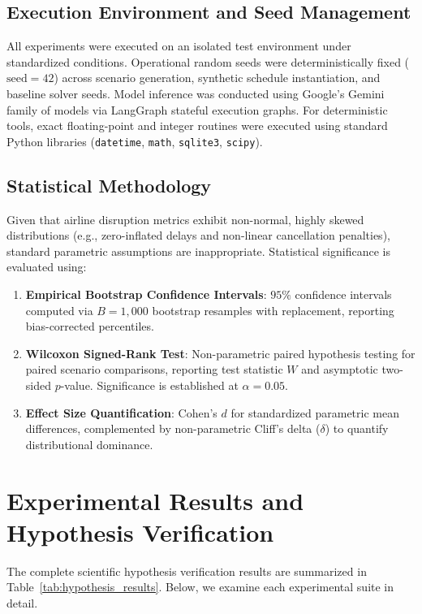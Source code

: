 \subsection{Execution Environment and Seed Management}
All experiments were executed on an isolated test environment under standardized conditions. Operational random seeds were deterministically fixed ($\text{seed}=42$) across scenario generation, synthetic schedule instantiation, and baseline solver seeds. Model inference was conducted using Google's Gemini family of models via LangGraph stateful execution graphs. For deterministic tools, exact floating-point and integer routines were executed using standard Python libraries (\texttt{datetime}, \texttt{math}, \texttt{sqlite3}, \texttt{scipy}).

\subsection{Statistical Methodology}
Given that airline disruption metrics exhibit non-normal, highly skewed distributions (e.g., zero-inflated delays and non-linear cancellation penalties), standard parametric assumptions are inappropriate. Statistical significance is evaluated using:
\begin{enumerate}
    \item \textbf{Empirical Bootstrap Confidence Intervals}: $95\%$ confidence intervals computed via $B=1,000$ bootstrap resamples with replacement, reporting bias-corrected percentiles.
    \item \textbf{Wilcoxon Signed-Rank Test}: Non-parametric paired hypothesis testing for paired scenario comparisons, reporting test statistic $W$ and asymptotic two-sided $p$-value. Significance is established at $\alpha = 0.05$.
    \item \textbf{Effect Size Quantification}: Cohen's $d$ for standardized parametric mean differences, complemented by non-parametric Cliff's delta ($\delta$) to quantify distributional dominance.
\end{enumerate}

\section{Experimental Results and Hypothesis Verification}
\label{sec:experimental_results}

The complete scientific hypothesis verification results are summarized in Table~\ref{tab:hypothesis_results}. Below, we examine each experimental suite in detail.

